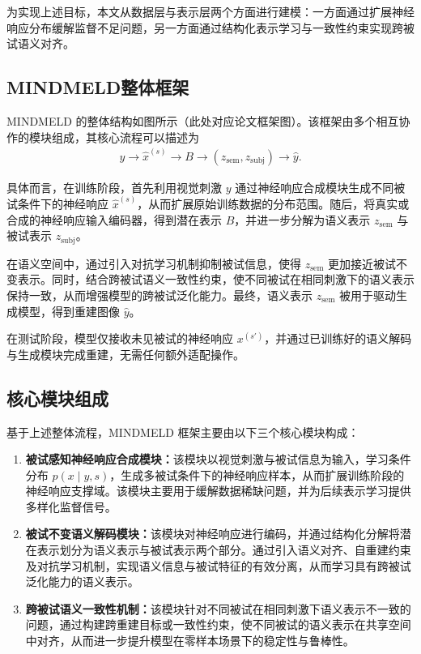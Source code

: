 为实现上述目标，本文从数据层与表示层两个方面进行建模：一方面通过扩展神经响应分布缓解监督不足问题，另一方面通过结构化表示学习与一致性约束实现跨被试语义对齐。

\subsection{MINDMELD整体框架}

MINDMELD 的整体结构如图所示（此处对应论文框架图）。该框架由多个相互协作的模块组成，其核心流程可以描述为
\begin{align}
  y \rightarrow \hat{x}^{(s)} \rightarrow B \rightarrow (z_{\mathrm{sem}}, z_{\mathrm{subj}}) \rightarrow \hat{y}.
\end{align}

具体而言，在训练阶段，首先利用视觉刺激 $y$ 通过神经响应合成模块生成不同被试条件下的神经响应 $\hat{x}^{(s)}$，从而扩展原始训练数据的分布范围。随后，将真实或合成的神经响应输入编码器，得到潜在表示 $B$，并进一步分解为语义表示 $z_{\mathrm{sem}}$ 与被试表示 $z_{\mathrm{subj}}$。

在语义空间中，通过引入对抗学习机制抑制被试信息，使得 $z_{\mathrm{sem}}$ 更加接近被试不变表示。同时，结合跨被试语义一致性约束，使不同被试在相同刺激下的语义表示保持一致，从而增强模型的跨被试泛化能力。最终，语义表示 $z_{\mathrm{sem}}$ 被用于驱动生成模型，得到重建图像 $\hat{y}$。

在测试阶段，模型仅接收未见被试的神经响应 $x^{(s')}$，并通过已训练好的语义解码与生成模块完成重建，无需任何额外适配操作。

\subsection{核心模块组成}

基于上述整体流程，MINDMELD 框架主要由以下三个核心模块构成：

\begin{enumerate}
  \item \textbf{被试感知神经响应合成模块：}该模块以视觉刺激与被试信息为输入，学习条件分布 $p(x \mid y,s)$，生成多被试条件下的神经响应样本，从而扩展训练阶段的神经响应支撑域。该模块主要用于缓解数据稀缺问题，并为后续表示学习提供多样化监督信号。
  \item \textbf{被试不变语义解码模块：}该模块对神经响应进行编码，并通过结构化分解将潜在表示划分为语义表示与被试表示两个部分。通过引入语义对齐、自重建约束及对抗学习机制，实现语义信息与被试特征的有效分离，从而学习具有跨被试泛化能力的语义表示。
  \item \textbf{跨被试语义一致性机制：}该模块针对不同被试在相同刺激下语义表示不一致的问题，通过构建跨重建目标或一致性约束，使不同被试的语义表示在共享空间中对齐，从而进一步提升模型在零样本场景下的稳定性与鲁棒性。
\end{enumerate}


